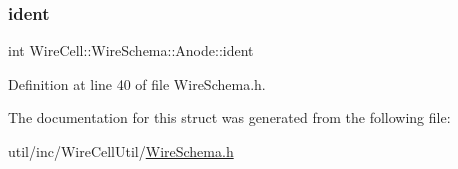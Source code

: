 \mbox{\label{struct_wire_cell_1_1_wire_schema_1_1_anode_abab2b1721d2d4858454210a290ce42eb}} 
\subsubsection{\texorpdfstring{ident}{ident}}
{\footnotesize\ttfamily int Wire\+Cell\+::\+Wire\+Schema\+::\+Anode\+::ident}



Definition at line 40 of file Wire\+Schema.\+h.



The documentation for this struct was generated from the following file\+:\begin{DoxyCompactItemize}
\item 
util/inc/\+Wire\+Cell\+Util/\hyperlink{_wire_schema_8h}{Wire\+Schema.\+h}\end{DoxyCompactItemize}
